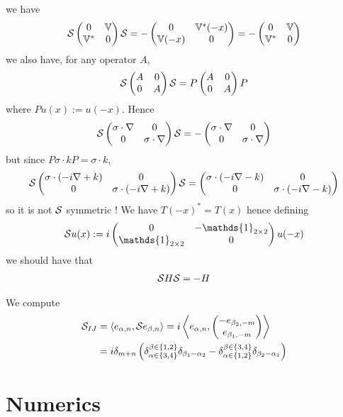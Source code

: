 \documentclass[11pt,a4paper,reqno,french,tikz]{amsart}
\newcommand{\pa}[1]{\left( #1 \right)} %
\newcommand{\acs}[1]{\left\{ #1 \right\}} %
\newcommand{\ps}[1]{\left< #1 \right>} %
\newcommand{\na}{\nabla} %
\newcommand{\mat}[1]{\begin{pmatrix} #1 \end{pmatrix}} %
\def\1{{\mathds{1}}}
\newcommand{\bbV}{\mathbb{V}}
\def\bbV{{\mathbb V}}
\def\1{{\mathds{1}}}
\begin{document}
we have
\begin{align*}
\cS \mat{0 & \bbV \\ \bbV^* & 0} \cS = -\mat{0 & \bbV^*(-x) \\ \bbV(-x) & 0} = - \mat{0 & \bbV \\ \bbV^* & 0}
\end{align*}
we also have, for any operator $A$,
\begin{align*}
	\cS \mat{A & 0 \\ 0 & A} \cS = P \mat{A & 0 \\ 0 & A} P
\end{align*}
where $Pu(x) := u(-x)$. Hence
\begin{align*}
	\cS \mat{\sigma \cdot \na & 0 \\ 0 & \sigma \cdot \na} \cS = - \mat{\sigma \cdot \na & 0 \\ 0 & \sigma \cdot \na}
\end{align*}
but since $P \sigma \cdot k P = \sigma \cdot k$, 
\begin{align*}
	\cS \mat{\sigma \cdot \pa{-i\na + k} & 0 \\ 0 & \sigma \cdot \pa{-i\na + k}} \cS = \mat{\sigma \cdot \pa{-i\na -k} & 0 \\ 0 & \sigma \cdot \pa{-i\na -k}} 
\end{align*}
so it is not $\mathcal{S}$ symmetric ! We have $T(-x)^* = T(x)$ hence defining
\begin{align*}
\cS u(x) := i \mat{0 & -\1_{2\times 2} \\ \1_{2\times 2} & 0} u(-x)
\end{align*}
we should have that
\begin{align*}
\mathcal{S} H \mathcal{S} = - H
\end{align*}

We compute
\begin{align*}
	\cS_{IJ} &= \ps{e_{\alpha,n},\cS e_{\beta,n}} = i \ps{e_{\alpha,n}, \mat{-e_{\beta_2,-m} \\ e_{\beta_1,-m}}} \\
&= i \delta_{m+n} \pa{\delta_{\alpha \in \acs{3,4}}^{\beta \in \acs{1,2}} \delta_{\beta_1-\alpha_2} -\delta_{\alpha \in \acs{1,2}}^{\beta \in \acs{3,4}}\delta_{\beta_2-\alpha_1}}
\end{align*}

\section{Numerics}%
\label{sec:numerics}
\end{document}
